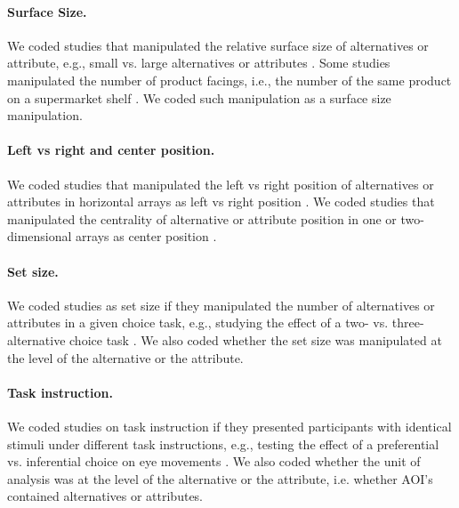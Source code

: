 \paragraph{Surface Size.} We coded studies that manipulated the relative surface size of alternatives or attribute, e.g., small vs. large alternatives or attributes \citep{lohse1997a}. Some studies manipulated the number of product facings, i.e., the number of the same product on a supermarket shelf \citep{chandon2009a}. We coded such manipulation as a surface size manipulation. 

\paragraph{Left vs right and center position.} We coded studies that manipulated the left vs right position of alternatives or attributes in horizontal arrays as left vs right position \citep{kreplin2014a}. We coded studies that manipulated the centrality of alternative or attribute position in one or two-dimensional arrays as center position \citep[experiment 1A \& 1B in][]{atalay2012a,meissner2016a}. 

\paragraph{Set size.} We coded studies as set size if they manipulated the number of alternatives or attributes in a given choice task, e.g., studying the effect of a two- vs. three-alternative choice task \citep{hong2016a}. We also coded whether the set size was manipulated at the level of the alternative or the attribute. 

\paragraph{Task instruction.} We coded studies on task instruction if they presented participants with identical stimuli under different task instructions, e.g., testing the effect of a preferential  vs. inferential choice on eye movements \citep{orquin2019a}. We also coded whether the unit of analysis was at the level of the alternative or the attribute, i.e. whether AOI's contained alternatives or attributes. 

